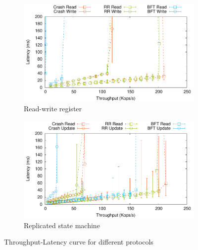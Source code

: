 \begin{figure}[th!]
    \centering
    \begin{subfigure}[t]{0.45 * 10cm}
        \includegraphics[width=\linewidth]{teem_results/protocol/1ms/reg-tput/result/reg}
        \caption{Read-write register}\label{fig:reg_tputlat}
    \end{subfigure}
    \begin{subfigure}[t]{0.45 * 10cm}
        \includegraphics[width=\linewidth]{teem_results/protocol/1ms/smr-tput/result/smr}
        \caption{Replicated state machine}\label{fig:smr_tputlat}
    \end{subfigure}
    \caption{Throughput-Latency curve for different protocols}
\end{figure}

